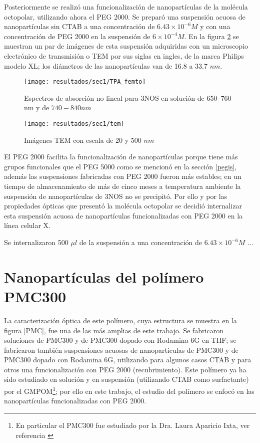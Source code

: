 Posteriormente se realiz\'o una funcionalizaci\'on de nanopart\'iculas de la mol\'ecula octopolar, utilizando ahora el PEG 2000. Se prepar\'o una suspensi\'on acuosa de nanopart\'iculas sin CTAB a una concentraci\'on de $6.43 \times 10^{-6} M$ y con una concentraci\'on de PEG 2000 en la suspensi\'on de $6\times 10^{-4} M$. En la figura \ref{temi} se muestran un par de im\'agenes de esta suspensi\'on adquiridas con un microscopio electr\'onico de transmisi\'on o TEM por sus siglas en ingles, de la marca Philips modelo XL; los di\'ametros de las nanopart\'iculas van de 16.8 a 33.7 $nm$. 


\begin{figure}[H]
\centering
\texttt{[image: resultados/sec1/TPA\_femto]}
\caption{Espectros de absorci\'on no lineal para 3NOS en soluci\'on de 650--760 nm y de $740-840nm$}\label{valoressigmafs}
\end{figure}

\begin{figure}[H]
\centering
\texttt{[image: resultados/sec1/tem]}
\caption{Im\'agenes TEM con escala de 20 y 500 $nm$}\label{temi}
\end{figure}

El PEG 2000 facilita la funcionalizaci\'on de nanopart\'iculas porque tiene m\'as grupos funcionales que el PEG 5000 como se mencion\'o en la secci\'on \ref{pegis}, adem\'as las suspensiones fabricadas con PEG 2000 fueron m\'as estables; en un tiempo de almacenamiento de m\'as de cinco meses a temperatura ambiente la suspensi\'on de nanopart\'iculas de 3NOS no se precipit\'o. Por ello y por las propiedades \'opticas que present\'o la mol\'ecula octopolar se decidi\'o internalizar esta suspensi\'on acuosa de nanopart\'iculas funcionalizadas con PEG 2000 en la l\'inea celular X.

Se internalizaron 500 $\mu l$ de la suspensi\'on a una concentraci\'on de $6.43 \times 10^{-6} M$ ...  


\section{Nanopart\'iculas del pol\'imero PMC300} 

La caracterizaci\'on \'optica de este pol\'imero, cuya estructura se muestra en la figura \ref{PMC}, fue una de las m\'as amplias de este trabajo. Se fabricaron soluciones de PMC300 y de PMC300 dopado con Rodamina 6G en THF; se fabricaron tambi\'en suspensiones acuosas de nanopart\'iculas de PMC300 y de PMC300 dopado con Rodamina 6G, utilizando para algunos casos CTAB y para otros una funcionalizaci\'on con PEG 2000 (recubrimiento). Este pol\'imero ya ha sido estudiado en soluci\'on y en suspensi\'on (utilizando CTAB como surfactante) por el GMPOM\footnote{En particular el PMC300 fue estudiado por la Dra. Laura Aparicio Ixta, ver referencia \cite{laurita}}; por ello en este trabajo, el estudio del pol\'imero se enfoc\'o en las nanopart\'iculas funcionalizadas con PEG 2000.

